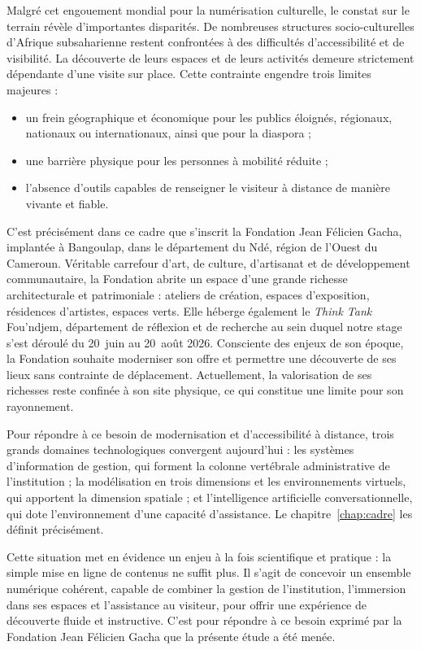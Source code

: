 Malgré cet engouement mondial pour la numérisation culturelle, le constat sur le
terrain révèle d'importantes disparités. De nombreuses structures
socio-culturelles d'Afrique subsaharienne restent confrontées à des difficultés
d'accessibilité et de visibilité. La découverte de leurs espaces et de leurs
activités demeure strictement dépendante d'une visite sur place. Cette
contrainte engendre trois limites majeures :

\begin{itemize}
  \item un frein géographique et économique pour les publics éloignés,
        régionaux, nationaux ou internationaux, ainsi que pour la diaspora ;
  \item une barrière physique pour les personnes à mobilité réduite ;
  \item l'absence d'outils capables de renseigner le visiteur à distance de
        manière vivante et fiable.
\end{itemize}

C'est précisément dans ce cadre que s'inscrit la Fondation Jean Félicien Gacha,
implantée à Bangoulap, dans le département du Ndé, région de l'Ouest du
Cameroun. Véritable carrefour d'art, de culture, d'artisanat et de développement
communautaire, la Fondation abrite un espace d'une grande richesse
architecturale et patrimoniale : ateliers de création, espaces d'exposition,
résidences d'artistes, espaces verts. Elle héberge également le \emph{Think
Tank} Fou'ndjem, département de réflexion et de recherche au sein duquel notre
stage s'est déroulé du 20~juin au 20~août 2026. Consciente des enjeux de son
époque, la Fondation souhaite moderniser son offre et permettre une découverte
de ses lieux sans contrainte de déplacement. Actuellement, la valorisation de
ses richesses reste confinée à son site physique, ce qui constitue une limite
pour son rayonnement.

Pour répondre à ce besoin de modernisation et d'accessibilité à distance, trois
grands domaines technologiques convergent aujourd'hui : les systèmes
d'information de gestion, qui forment la colonne vertébrale administrative de
l'institution ; la modélisation en trois dimensions et les environnements
virtuels, qui apportent la dimension spatiale ; et l'intelligence artificielle
conversationnelle, qui dote l'environnement d'une capacité d'assistance. Le
chapitre~\ref{chap:cadre} les définit précisément.

Cette situation met en évidence un enjeu à la fois scientifique et pratique : la
simple mise en ligne de contenus ne suffit plus. Il s'agit de concevoir un
ensemble numérique cohérent, capable de combiner la gestion de l'institution,
l'immersion dans ses espaces et l'assistance au visiteur, pour offrir une
expérience de découverte fluide et instructive. C'est pour répondre à ce besoin
exprimé par la Fondation Jean Félicien Gacha que la présente étude a été menée.

